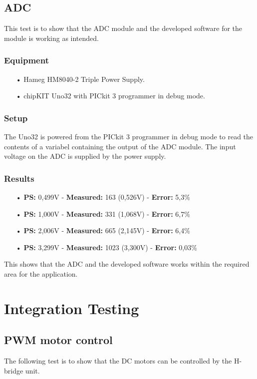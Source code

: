 \subsection{ADC}
This test is to show that the ADC module and the developed software for the module is working as intended.

\subsubsection{Equipment}
\begin{enumerate}
	\item[•]Hameg HM8040-2 Triple Power Supply.
	\item[•]chipKIT Uno32 with PICkit 3 programmer in debug mode.
\end{enumerate}

\subsubsection{Setup}
The Uno32 is powered from the PICkit 3 programmer in debug mode to read the contents of a variabel containing the output of the ADC module.
The input voltage on the ADC is supplied by the power supply.

\subsubsection{Results}
\begin{enumerate}
	\item[•] \textbf{PS:} 0,499V - \textbf{Measured:} 163 (0,526V) - \textbf{Error:} 5,3\%
	\item[•] \textbf{PS:} 1,000V - \textbf{Measured:} 331 (1,068V) - \textbf{Error:} 6,7\%
	\item[•] \textbf{PS:} 2,006V - \textbf{Measured:} 665 (2,145V) - \textbf{Error:} 6,4\%
	\item[•] \textbf{PS:} 3,299V - \textbf{Measured:} 1023 (3,300V) - \textbf{Error:} 0,03\%
\end{enumerate}
This shows that the ADC and the developed software works within the required area for the application.
\newpage
\section{Integration Testing}

\subsection{PWM motor control}
The following test is to show that the DC motors can be controlled by the H-bridge unit.

